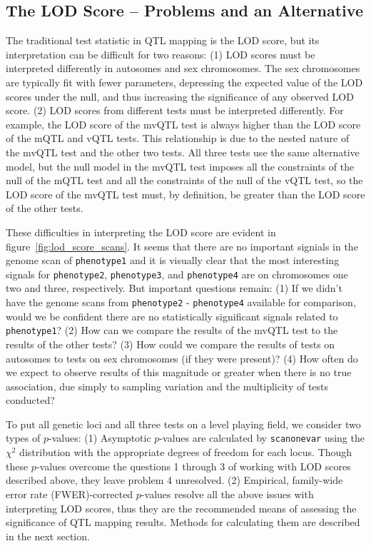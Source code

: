 \documentclass{article}
\begin{document}
\subsection*{The LOD Score -- Problems and an Alternative}
The traditional test statistic in QTL mapping is the LOD score, but its interpretation can be difficult for two reasons:
(1) LOD scores must be interpreted differently in autosomes and sex chromosomes.
The sex chromosomes are typically fit with fewer parameters, depressing the expected value of the LOD scores under the null, and thus increasing the significance of any observed LOD score.
(2) LOD scores from different tests must be interpreted differently.
For example, the LOD score of the mvQTL test is always higher than the LOD score of the mQTL and vQTL tests.
This relationship is due to the nested nature of the mvQTL test and the other two tests.
All three tests use the same alternative model, but the null model in the mvQTL test imposes all the constraints of the null of the mQTL test and all the constraints of the null of the vQTL test, so the LOD score of the mvQTL test must, by definition, be greater than the LOD score of the other tests.

These difficulties in interpreting the LOD score are evident in figure~\ref{fig:lod_score_scans}.
It seems that there are no important signials in the genome scan of \texttt{phenotype1} and it is visually clear that the most interesting signals for \texttt{phenotype2}, \texttt{phenotype3}, and \texttt{phenotype4} are on chromosomes one two and three, respectively.
But important questions remain:
(1) If we didn't have the genome scans from \texttt{phenotype2} - \texttt{phenotype4} available for comparison, would we be confident there are no statistically significant signals related to \texttt{phenotype1}?
(2) How can we compare the results of the mvQTL test to the results of the other tests?
(3) How could we compare the results of tests on autosomes to tests on sex chromosomes (if they were present)?
(4) How often do we expect to observe results of this magnitude or greater when there is no true association, due simply to sampling variation and the multiplicity of tests conducted?

To put all genetic loci and all three tests on a level playing field, we consider two types of $p$-values:
(1) Asymptotic $p$-values are calculated by \texttt{scanonevar} using the $\chi^2$ distribution with the appropriate degrees of freedom for each locus.
Though these $p$-values overcome the questions 1 through 3 of working with LOD scores described above, they leave problem 4 unresolved.
(2) Empirical, family-wide error rate (FWER)-corrected $p$-values resolve all the above issues with interpreting LOD scores, thus they are the recommended means of assessing the significance of QTL mapping results.
Methods for calculating them are described in the next section.
\end{document}
